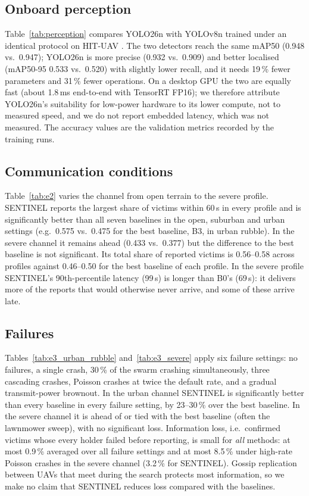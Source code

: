 \subsection{Onboard perception}\label{sec:eval:perception}
Table~\ref{tab:perception} compares YOLO26n with YOLOv8n trained under an identical protocol on
HIT-UAV \cite{hituav}. The two detectors reach the same mAP50 (0.948 vs.\ 0.947); YOLO26n is more
precise (0.932 vs.\ 0.909) and better localised (mAP50-95 0.533 vs.\ 0.520) with slightly lower
recall, and it needs 19\,\% fewer parameters and 31\,\% fewer operations. On a desktop GPU the two
are equally fast (about 1.8\,ms end-to-end with TensorRT FP16); we therefore attribute YOLO26n's
suitability for low-power hardware to its lower compute, not to measured speed, and we do not report
embedded latency, which was not measured. The accuracy values are the validation metrics recorded by
the training runs.


\subsection{Communication conditions}\label{sec:eval:channel}
Table~\ref{tab:e2} varies the channel from open terrain to the severe profile. SENTINEL reports the
largest share of victims within 60\,s in every profile and is significantly better than all seven
baselines in the open, suburban and urban settings (e.g.\ 0.575 vs.\ 0.475 for the best baseline,
B3, in urban rubble). In the severe channel it remains ahead (0.433 vs.\ 0.377) but the difference to
the best baseline is not significant. Its total share of reported victims is 0.56--0.58 across
profiles against 0.46--0.50 for the best baseline of each profile. In the severe profile SENTINEL's 90th-percentile
latency (99\,s) is longer than B0's (69\,s): it delivers more of the reports that would otherwise
never arrive, and some of these arrive late.


\subsection{Failures}\label{sec:eval:failures}
Tables~\ref{tab:e3_urban_rubble} and~\ref{tab:e3_severe} apply six failure settings: no failures, a single
crash, 30\,\% of the swarm crashing simultaneously, three cascading crashes, Poisson crashes at twice
the default rate, and a gradual transmit-power brownout. In the urban channel SENTINEL is
significantly better than every baseline in every failure setting, by 23--30\,\% over the best
baseline. In the severe channel it is ahead of or tied with the best baseline (often the lawnmower
sweep), with no significant loss. Information loss, i.e.\ confirmed victims whose every holder
failed before reporting, is small for \emph{all} methods: at most 0.9\,\% averaged over all failure settings
and at most 8.5\,\% under high-rate Poisson crashes in the severe channel (3.2\,\% for
SENTINEL). Gossip replication between UAVs that meet during the search protects most information,
so we make no claim that SENTINEL reduces loss compared with the baselines.



